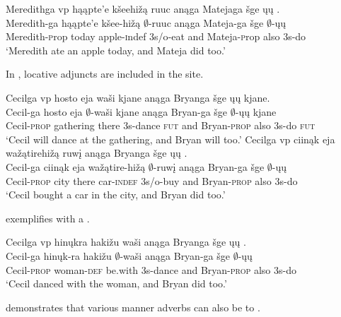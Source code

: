 \documentclass[output=paper]{LSP/langsci}
\begin{document}
\ex 
\glll Meredithga  {\ob}{vp} hąąpte'e kšeehižą ruuc{\cb} anąga Matejaga šge {\ob}ųų{\cb} .\\
Meredith-ga {} hąąpte'e kšee-hižą $\emptyset$-ruuc anąga Mateja-ga šge $\emptyset$-ųų\\
Meredith-{\textsc prop} {} today apple-{\textsc indef} {\textsc 3s/o}-eat and Mateja-{\textsc prop} also {\textsc 3s}-do\\
\trans `Meredith ate an apple today, and Mateja did too.'
\z
\z

In , locative adjuncts are included in the  site. 
 
\ea\label{ex:johnson:8}
\ea 
\glll Cecilga {\ob}{vp} hosto eja waši{\cb} kjane anąga Bryanga šge {\ob}ųų{\cb} kjane.\\
Cecil-ga {} hosto eja $\emptyset$-waši kjane anąga Bryan-ga šge $\emptyset$-ųų kjane\\
Cecil-\textsc{prop} {} gathering there {\textsc 3s}-dance \textsc{fut} and Bryan-\textsc{prop} also {\textsc 3s}-do \textsc{fut}\\
\trans `Cecil will dance at the gathering, and Bryan will too.'
\ex 
\glll Cecilga {\ob}{vp} ciinąk eja wažątirehižą ruwį{\cb} anąga Bryanga šge {\ob}ųų{\cb} .\\
Cecil-ga {} ciinąk eja wažątire-hižą $\emptyset$-ruwį anąga Bryan-ga šge $\emptyset$-ųų\\
Cecil-\textsc{prop} {} city there car-\textsc{indef} {\textsc 3s/o}-buy and Bryan-\textsc{prop} also {\textsc 3s}-do\\
\trans `Cecil bought a car in the city, and Bryan did too.'
\z
\z

 exemplifies  with a .
 
\ea\label{ex:johnson:9} 
\glll Cecilga {\ob}{vp} hinųkra hakižu waši{\cb} anąga Bryanga šge {\ob}ųų{\cb} .\\
Cecil-ga {} hinųk-ra hakižu $\emptyset$-waši anąga Bryan-ga šge $\emptyset$-ųų\\
Cecil-\textsc{prop} {} woman-\textsc{def} be.with {\textsc 3s}-dance and Bryan-\textsc{prop} also {\textsc 3s}-do\\
\trans `Cecil danced with the woman, and Bryan did too.'
\z

 demonstrates that various manner adverbs can also be  to .
 
\end{document}

